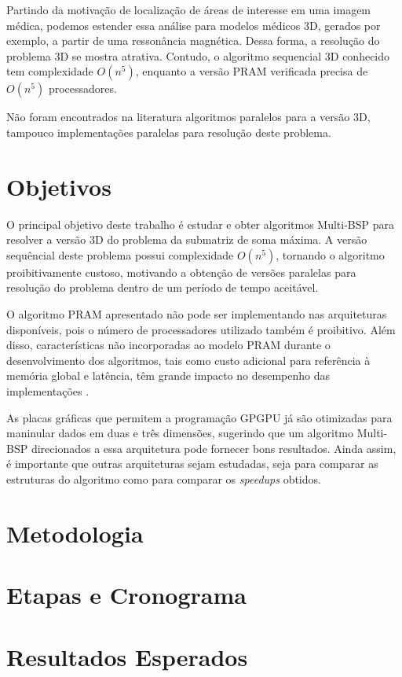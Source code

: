 \documentclass[a4paper, 12pt] {article}
\begin{document}
Partindo da motivação de localização de áreas de interesse em uma imagem médica,
podemos estender essa análise para modelos médicos 3D, gerados por exemplo, a
partir de uma ressonância magnética. Dessa forma, a resolução do problema 3D se
mostra atrativa. Contudo, o algoritmo sequencial 3D conhecido tem complexidade
$O(n^5)$, enquanto a versão PRAM verificada precisa de $O(n^5)$ processadores.

Não foram encontrados na literatura algoritmos paralelos para a versão
3D, tampouco implementações paralelas para resolução deste problema.


\section{Objetivos}

O principal objetivo deste trabalho é estudar e obter algoritmos Multi-BSP
para resolver a versão 3D do problema da submatriz de soma máxima. A versão sequêncial deste
problema possui complexidade $O(n^5)$, tornando o algoritmo proibitivamente
custoso, motivando a obtenção de versões paralelas para resolução do problema
dentro de um período de tempo aceitável.

O algoritmo PRAM apresentado não pode ser implementando nas arquiteturas
disponíveis, pois o número de processadores utilizado também é proibitivo. Além
disso, características não incorporadas ao modelo PRAM durante o
desenvolvimento dos algoritmos, tais como custo adicional para referência à memória global e latência, 
têm grande impacto no desempenho das implementações \cite{castro2003}.

As placas gráficas que permitem a programação GPGPU já são otimizadas para
maninular dados em duas e três dimensões, sugerindo que um algoritmo Multi-BSP
direcionados a essa arquitetura pode fornecer bons resultados. Ainda assim, é
importante que outras arquiteturas sejam estudadas, seja para comparar as
estruturas do algoritmo como para comparar os \textit{speedups} obtidos.

\section{Metodologia}



\section{Etapas e Cronograma}

\section{Resultados Esperados}



\end{document}
